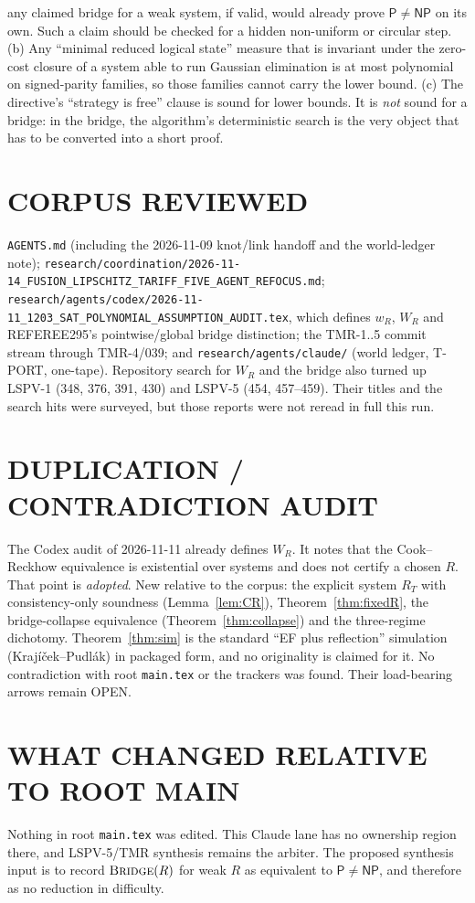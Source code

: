 \documentclass[11pt]{article}
\newcommand{\Pclass}{\mathsf P}
\newcommand{\NP}{\mathsf{NP}}
\begin{document}
\begin{description}
  any claimed bridge for a weak system, if valid, would already prove
  $\Pclass\ne\NP$ on its own. Such a claim should be checked for a hidden
  non-uniform or circular step. (b) Any ``minimal reduced logical state''
  measure that is invariant under the zero-cost closure of a system able to
  run Gaussian elimination is at most polynomial on signed-parity families,
  so those families cannot carry the lower bound. (c) The directive's
  ``strategy is free'' clause is sound for lower bounds. It is \emph{not}
  sound for a bridge: in the bridge, the algorithm's deterministic search is
  the very object that has to be converted into a short proof.
\end{description}

\section*{CORPUS REVIEWED}
\texttt{AGENTS.md} (including the 2026-11-09 knot/link handoff and the world-ledger
note); \texttt{research/coordination/2026-11-14\_FUSION\_LIPSCHITZ\_TARIFF\_FIVE\_AGENT\_REFOCUS.md};
\texttt{research/agents/codex/2026-11-11\_1203\_SAT\_POLYNOMIAL\_ASSUMPTION\_AUDIT.tex},
which defines $w_R$, $W_R$ and REFEREE295's pointwise/global bridge distinction;
the TMR-1..5 commit stream through TMR-4/039; and
\texttt{research/agents/claude/} (world ledger, T-PORT, one-tape).
Repository search for $W_R$ and the bridge also turned up LSPV-1 (348, 376,
391, 430) and LSPV-5 (454, 457--459). Their titles and the search hits were
surveyed, but those reports were not reread in full this run.

\section*{DUPLICATION / CONTRADICTION AUDIT}
The Codex audit of 2026-11-11 already defines $W_R$. It notes that the
Cook--Reckhow equivalence is existential over systems and does not certify a
chosen $R$. That point is \emph{adopted}. New relative to the corpus: the explicit
system $R_T$ with consistency-only soundness (Lemma~\ref{lem:CR}),
Theorem~\ref{thm:fixedR}, the bridge-collapse equivalence
(Theorem~\ref{thm:collapse}) and the three-regime dichotomy. Theorem~\ref{thm:sim}
is the standard ``EF plus reflection'' simulation (Krajíček--Pudlák) in
packaged form, and no originality is claimed for it. No contradiction with root
\texttt{main.tex} or the trackers was found. Their load-bearing arrows remain
OPEN.

\section*{WHAT CHANGED RELATIVE TO ROOT MAIN}
Nothing in root \texttt{main.tex} was edited. This Claude lane has no
ownership region there, and LSPV-5/TMR synthesis remains the arbiter. The
proposed synthesis input is to record $\textsc{Bridge}(R)$ for weak $R$ as
equivalent to $\Pclass\ne\NP$, and therefore as no reduction in difficulty.
\end{document}
